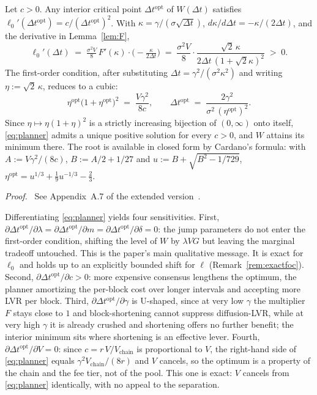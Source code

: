 \documentclass[runningheads]{llncs}
\newcommand{\dt}{\Delta t}
\newcommand{\1}{\mathbf{1}}
\newif\ifextended
\newcommand{\deferproof}[1]{%
  \par\smallskip\noindent\textit{Proof.}\ \ifextended
  See Appendix~#1.\else
  See Appendix~#1 of the extended version~\cite{bundi2026ext}.\fi\par\smallskip}
\begin{document}
\begin{theorem}\label{thm:planner}
Let $c > 0$. Any interior critical point $\dt^{\mathrm{opt}}$ of $W(\dt)$ satisfies
$\ell_0'(\dt^{\mathrm{opt}}) = c/(\dt^{\mathrm{opt}})^2$.
With $\kappa = \gamma/(\sigma\sqrt{\dt})$, $d\kappa/d\dt = -\kappa/(2\dt)$, and the derivative in Lemma~\ref{lem:F},
\begin{equation}\label{eq:focexplicit}
\ell_0'(\dt) \;=\; \tfrac{\sigma^2 V}{8}\,F'(\kappa)\cdot\Big(\!-\tfrac{\kappa}{2\dt}\Big)
\;=\; \frac{\sigma^2 V}{8}\cdot\frac{\sqrt2\,\kappa}{2\dt\,(1+\sqrt2 \kappa)^2} \;>\; 0 .
\end{equation}
The first-order condition, after substituting $\dt = \gamma^2 / (\sigma^2 \kappa^2)$ and writing $\eta := \sqrt2\,\kappa$, reduces to a cubic:
\begin{equation}\label{eq:planner}
\boxed{\;\eta^{\mathrm{opt}}\big(1+\eta^{\mathrm{opt}}\big)^{2} \;=\; \frac{V\gamma^2}{8c},
\qquad
\dt^{\mathrm{opt}} \;=\; \frac{2\gamma^2}{\sigma^2\,(\eta^{\mathrm{opt}})^2}.\;}
\end{equation}
Since $\eta\mapsto\eta(1+\eta)^2$ is a strictly increasing bijection of $(0,\infty)$ onto itself, \eqref{eq:planner} admits a unique positive solution for every $c>0$, and $W$ attains its minimum there. The root is available in closed form by Cardano's formula: with $A := V\gamma^2/(8c)$, $B := A/2 + 1/27$ and $u := B + \sqrt{B^2 - 1/729}$,
$\eta^{\mathrm{opt}} = u^{1/3} + \tfrac{1}{9}u^{-1/3} - \tfrac{2}{3}$.
\end{theorem}

\deferproof{A.7}

\begin{remark}\label{rem:cs}
Differentiating \eqref{eq:planner} yields four sensitivities. First, $\partial \dt^{\mathrm{opt}}/\partial \lambda = \partial \dt^{\mathrm{opt}}/\partial m = \partial \dt^{\mathrm{opt}}/\partial \delta = 0$: the jump parameters do not enter the first-order condition, shifting the level of $W$ by $\lambda V G$ but leaving the marginal tradeoff untouched. This is the paper's main qualitative message. It is exact for $\ell_0$ and holds up to an explicitly bounded shift for $\ell$ (Remark~\ref{rem:exactfoc}). Second, $\partial \dt^{\mathrm{opt}}/\partial c > 0$: more expensive consensus lengthens the optimum, the planner amortizing the per-block cost over longer intervals and accepting more LVR per block. Third, $\partial \dt^{\mathrm{opt}}/\partial \gamma$ is U-shaped, since at very low $\gamma$ the multiplier $F$ stays close to $1$ and block-shortening cannot suppress diffusion-LVR, while at very high $\gamma$ it is already crushed and shortening offers no further benefit; the interior minimum sits where shortening is an effective lever. Fourth, $\partial \dt^{\mathrm{opt}}/\partial V = 0$: since $c = r\,V/V_{\text{chain}}$ is proportional to $V$, the right-hand side of \eqref{eq:planner} equals $\gamma^2 V_{\text{chain}}/(8r)$ and $V$ cancels, so the optimum is a property of the chain and the fee tier, not of the pool. This one is exact: $V$ cancels from \eqref{eq:planner} identically, with no appeal to the separation.
\end{remark}
\end{document}
